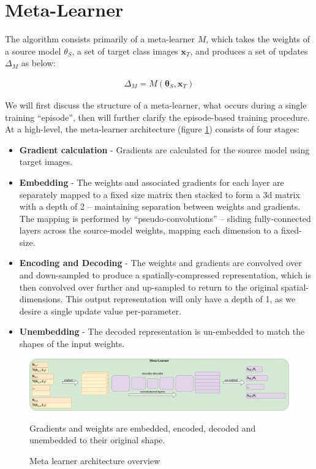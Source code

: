 \documentclass{report}
\begin{document}
\section{Meta-Learner} \label{meta-learner-sub}
The algorithm consists primarily of a meta-learner $M$, which takes the weights of a source model $\theta_S$, a set of target class images $\bm{x}_T$, and produces a set of updates $\Delta_M$ as below:

	\begin{align}
	\Delta_M = M(\bm{\theta}_S, \bm{x}_T)
	\end{align}

We will first discuss the structure of a meta-learner, what occurs during a single training ``episode'', then will further clarify the episode-based training procedure. At a high-level, the meta-learner architecture (figure \ref{fig:ml:3}) consists of four stages:
\begin{itemize}
	\item \textbf{Gradient calculation} - Gradients are calculated for the source model using target images.
	\item \textbf{Embedding} - The weights and associated gradients for each layer are separately mapped to a fixed size matrix then stacked to form a 3d matrix with a depth of 2 -- maintaining separation between weights and gradients. The mapping is performed by ``pseudo-convolutions'' -- sliding fully-connected layers across the source-model weights, mapping each dimension to a fixed-size.
	\item \textbf{Encoding and Decoding} - The weights and gradients are convolved over and down-sampled to produce a spatially-compressed representation, which is then convolved over further and up-sampled to return to the original spatial-dimensions. This output representation will only have a depth of 1, as we desire a single update value per-parameter.
	\item \textbf{Unembedding} - The decoded representation is un-embedded to match the shapes of the input weights.
\end{itemize}
\begin{figure}[h!]
	\centering
	\includegraphics[width=17cm]{metalearnerarchitecture}
	\caption{Meta learner architecture overview}
	\label{fig:ml:3}
	Gradients and weights are embedded, encoded, decoded and unembedded to their original shape.
\end{figure}
\end{document}
